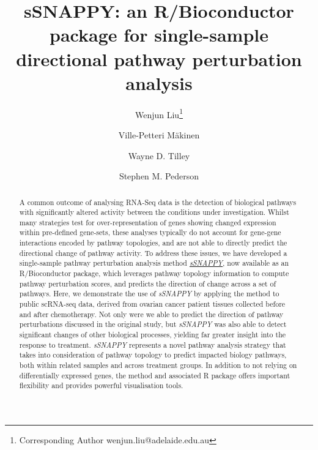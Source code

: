 \documentclass[9pt,a4paper,]{extarticle}
\begin{document}
\pagestyle{front}

\title{sSNAPPY: an R/Bioconductor package for single-sample directional pathway perturbation analysis}

\author[1,2,3]{Wenjun Liu\thanks{\ttfamily Corresponding Author wenjun.liu@adelaide.edu.au}}
\author[4,5]{Ville-Petteri Mäkinen}
\author[1]{Wayne D. Tilley}
\author[1,6,7]{Stephen M. Pederson}

\maketitle
\thispagestyle{front}

\begin{abstract}
A common outcome of analysing RNA-Seq data is the detection of biological pathways with significantly altered activity between the conditions under investigation. Whilst many strategies test for over-representation of genes showing changed expression within pre-defined gene-sets, these analyses typically do not account for gene-gene interactions encoded by pathway topologies, and are not able to directly predict the directional change of pathway activity. To address these issues, we have developed a single-sample pathway perturbation analysis method \href{https://bioconductor.org/packages/sSNAPPY}{\emph{sSNAPPY}}, now available as an R/Bioconductor package, which leverages pathway topology information to compute pathway perturbation scores, and predicts the direction of change across a set of pathways. Here, we demonstrate the use of \emph{sSNAPPY} by applying the method to public scRNA-seq data, derived from ovarian cancer patient tissues collected before and after chemotherapy. Not only were we able to predict the direction of pathway perturbations discussed in the original study, but \emph{sSNAPPY} was also able to detect significant changes of other biological processes, yielding far greater insight into the response to treatment. \emph{sSNAPPY} represents a novel pathway analysis strategy that takes into consideration of pathway topology to predict impacted biology pathways, both within related samples and across treatment groups. In addition to not relying on differentially expressed genes, the method and associated R package offers important flexibility and provides powerful visualisation tools.
\end{abstract}
\end{document}
